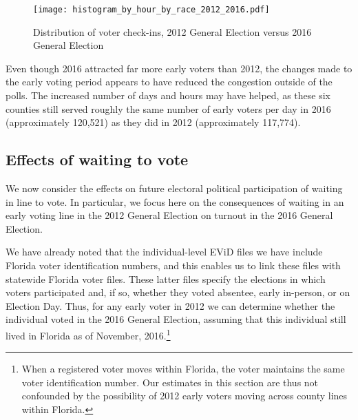 \documentclass[12pt,titlepage]{article}
\begin{document}
\begin{figure}[!ht]
  \caption{Distribution of voter check-ins, 2012 General Election versus 2016 General Election}
  \label{fig:race2012and2016}
  \centering
  \centering\texttt{[image: histogram\_by\_hour\_by\_race\_2012\_2016.pdf]}
\end{figure}

Even though 2016 attracted far more early voters than 2012, the
changes made to the early voting period appears to have reduced the
congestion outside of the polls. The increased number of days and
hours may have helped, as these six counties still served roughly the
same number of early voters per day in 2016 (approximately 120,521) as
they did in 2012 (approximately 117,774). 





\subsection*{Effects of waiting to vote}

We now consider the effects on future electoral political
participation of waiting in line to vote.  In particular, we focus
here on the consequences of waiting in an early voting line in the
2012 General Election on turnout in the 2016 General Election.

We have already noted that the individual-level EViD files we have
include Florida voter identification numbers, and this enables us to
link these files with statewide Florida voter files.  These latter
files specify the elections in which voters participated and, if so,
whether they voted absentee, early in-person, or on Election Day.
Thus, for any early voter in 2012 we can determine whether the
individual voted in the 2016 General Election, assuming that this
individual still lived in Florida as of November, 2016.\footnote{When
  a registered voter moves within Florida, the voter maintains the
  same voter identification number.  Our estimates in this section are
  thus not confounded by the possibility of 2012 early voters moving
  across county lines within Florida.}
\end{document}
